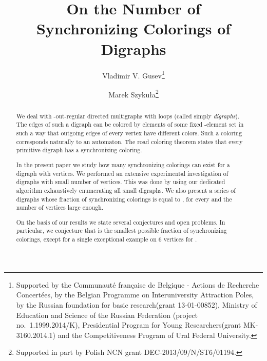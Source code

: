 \documentclass[runningheads]{llncs}
\begin{document}
\title{On the Number of\\Synchronizing Colorings of Digraphs}

\author{Vladimir V. Gusev\thanks{Supported by the Communaut{\'e} fran\c{c}aise de Belgique
- Actions de Recherche Concert{\'e}es, by the Belgian Programme on
Interuniversity Attraction Poles, by the Russian foundation for basic research(grant 13-01-00852), Ministry of Education and Science of the Russian Federation (project no.\ 1.1999.2014/K), Presidential Program for Young Researchers(grant MK-3160.2014.1) and the Competitiveness Program of Ural Federal University.}
\and
Marek Szyku{\l}a\thanks{Supported in part by Polish NCN grant DEC-2013/09/N/ST6/01194.}}




\maketitle

\begin{abstract}
We deal with -out-regular directed multigraphs with loops (called simply \emph{digraphs}).
The edges of such a digraph can be colored by elements of some fixed -element set in such a way that outgoing edges of every vertex have different colors. Such a coloring corresponds naturally to an automaton.
The road coloring theorem states that every primitive digraph has a synchronizing coloring.

In the present paper we study how many synchronizing colorings can exist for a digraph with  vertices.
We performed an extensive experimental investigation of digraphs with small number of vertices. This was done by using our dedicated algorithm exhaustively enumerating all small digraphs.
We also present a series of digraphs whose fraction of synchronizing colorings is equal to , for every  and the number of vertices large enough.

On the basis of our results we state several conjectures and open problems. In particular, we conjecture that  is the smallest possible fraction of synchronizing colorings, except for a single exceptional example on 6 vertices for .
\end{abstract}
\end{document}
